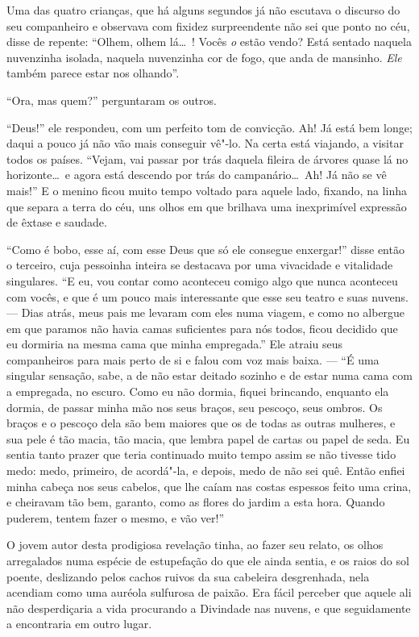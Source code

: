 Uma das quatro crianças, que há alguns segundos já não escutava o
discurso do seu companheiro e observava com fixidez surpreendente não
sei que ponto no céu, disse de repente: “Olhem, olhem
lá\ldots\ ! Vocês \textit{o} estão vendo? Está sentado naquela nuvenzinha isolada,
naquela nuvenzinha cor de fogo, que anda de mansinho. \textit{Ele} também
parece estar nos olhando''.

\quebra

“Ora, mas quem?'' perguntaram os outros.

“Deus!'' ele respondeu, com um perfeito tom de
convicção. Ah! Já está bem longe; daqui a pouco
já não vão mais conseguir vê"-lo. Na certa está viajando, a
visitar todos os países. “Vejam, vai passar por trás daquela fileira
de árvores quase lá no horizonte\ldots\  e agora está descendo por
trás do campanário\ldots\  Ah! Já não se vê mais!'' E
o menino ficou muito tempo voltado para aquele lado, fixando, na linha
que separa a terra do céu, uns olhos em que brilhava uma inexprimível
expressão de êxtase e saudade.

“Como é bobo, esse aí, com esse Deus que só ele consegue
enxergar!'' disse então o terceiro, cuja pessoinha inteira
se destacava por uma vivacidade e vitalidade singulares.
“E eu, vou contar como aconteceu comigo algo que
nunca aconteceu com vocês, e que é um pouco mais interessante que esse seu
teatro e suas nuvens. --- Dias atrás, meus pais me levaram com
eles numa viagem, e como no albergue em que paramos não havia camas
suficientes para nós todos, ficou decidido que eu dormiria na mesma
cama que minha empregada.” Ele atraiu seus companheiros
para mais perto de si e falou com voz mais baixa. --- “É
uma singular sensação, sabe, a de não estar deitado sozinho e de estar
numa cama com a empregada, no escuro. Como eu não dormia, fiquei
brincando, enquanto ela dormia, de passar minha mão nos seus braços, 
seu pescoço, seus ombros. Os braços e o pescoço dela são bem
maiores que os de todas as outras mulheres, e sua pele é tão macia, tão
macia, que lembra papel de cartas ou papel de seda. Eu sentia tanto
prazer que teria continuado muito tempo assim se não tivesse tido
medo: medo, primeiro, de acordá"-la, e depois, medo de não sei quê.
Então enfiei minha cabeça nos seus cabelos, que lhe caíam nas costas
espessos feito uma crina, e cheiravam tão bem, garanto, como as
flores do jardim a esta hora. Quando puderem, tentem fazer o mesmo, e vão ver!''

O jovem autor desta prodigiosa revelação tinha, ao fazer seu relato, os
olhos arregalados numa espécie de estupefação do que ele ainda
sentia, e os raios do sol poente, deslizando pelos cachos ruivos da sua
cabeleira desgrenhada, nela acendiam como uma auréola sulfurosa de
paixão. Era fácil perceber que aquele ali não desperdiçaria a vida
procurando a Divindade nas nuvens, e que seguidamente a encontraria 
em outro lugar.

